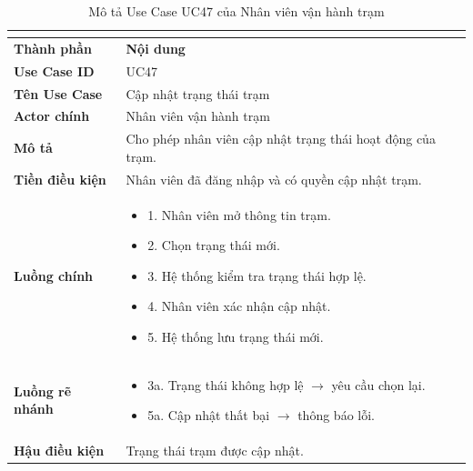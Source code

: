 \begin{longtable}{|C{3cm}|L{11cm}|}
\caption{Mô tả Use Case UC47 của Nhân viên vận hành trạm}\\
\label{tab:mo-ta-uc47-van-hanh-tram}\\
\hline
\textbf{Thành phần} & \textbf{Nội dung} \\
\hline
\textbf{Use Case ID} & UC47 \\
\hline
\textbf{Tên Use Case} & Cập nhật trạng thái trạm \\
\hline
\textbf{Actor chính} & Nhân viên vận hành trạm \\
\hline
\textbf{Mô tả} &
Cho phép nhân viên cập nhật trạng thái hoạt động của trạm.
\\
\hline
\textbf{Tiền điều kiện} &
Nhân viên đã đăng nhập và có quyền cập nhật trạm.
\\
\hline
\textbf{Luồng chính} &
\begin{itemize}[leftmargin=*,topsep=2pt,itemsep=2pt]
    \item 1. Nhân viên mở thông tin trạm.
    \item 2. Chọn trạng thái mới.
    \item 3. Hệ thống kiểm tra trạng thái hợp lệ.
    \item 4. Nhân viên xác nhận cập nhật.
    \item 5. Hệ thống lưu trạng thái mới.
\end{itemize}
\\
\hline
\textbf{Luồng rẽ nhánh} &
\begin{itemize}[leftmargin=*,topsep=2pt,itemsep=2pt]
    \item 3a. Trạng thái không hợp lệ $\rightarrow$ yêu cầu chọn lại.
    \item 5a. Cập nhật thất bại $\rightarrow$ thông báo lỗi.
\end{itemize}
\\
\hline
\textbf{Hậu điều kiện} &
Trạng thái trạm được cập nhật.
\\
\hline
\end{longtable}


